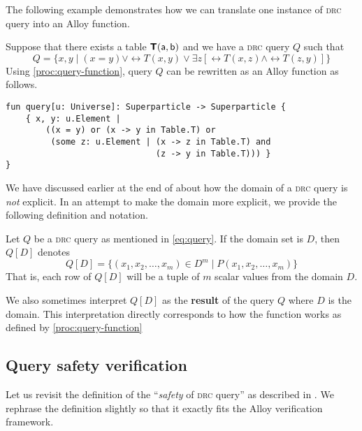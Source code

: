 \newpage
{}
The following example demonstrates how we can translate one instance of \textsc{drc} query into an Alloy function.

\smallskip
\begin{example}
    Suppose that there exists a table $\rel{T}(\field{a, b})$ and we have a \textsc{drc} query $Q$ such that
    \[
        Q = \{ x, y \mid (x = y) \vee \rel{T}(x, y) \vee \exists z [\rel{T}(x, z) \wedge \rel{T}(z, y)] \}
    \]
    Using \autoref{proc:query-function}, query $Q$ can be rewritten as an Alloy function as follows.

\begin{lstlisting}[language=alloy]
fun query[u: Universe]: Superparticle -> Superparticle {
    { x, y: u.Element |
        ((x = y) or (x -> y in Table.T) or
         (some z: u.Element | (x -> z in Table.T) and
                              (z -> y in Table.T))) }
}
\end{lstlisting}
\end{example}

We have discussed earlier at the end of  about how the domain of a \textsc{drc} query is \emph{not} explicit. In an attempt to make the domain more explicit, we provide the following definition and notation.

\smallskip
\begin{definition}
    \label{def:query-interp}
    Let $Q$ be a \textsc{drc} query as mentioned in \eqref{eq:query}. If the domain set is $D$, then $Q[D]$ denotes
    \[
        Q[D] = \{(x_1,x_2,\ldots,x_m) \in D^m \mid P(x_1,x_2,\ldots,x_m)\}
    \]
    That is, each row of $Q[D]$ will be a tuple of $m$ scalar values from the domain $D$.

    We also sometimes interpret $Q[D]$ as the \textbf{result} of the query $Q$ where $D$ is the domain. This interpretation directly corresponds to how the  function works as defined by \autoref{proc:query-function}
\end{definition}


\subsection{Query safety verification}

Let us revisit the definition of the ``\textit{safety} of \textsc{drc} query'' as described in . We rephrase the definition slightly so that it exactly fits the Alloy verification framework.

